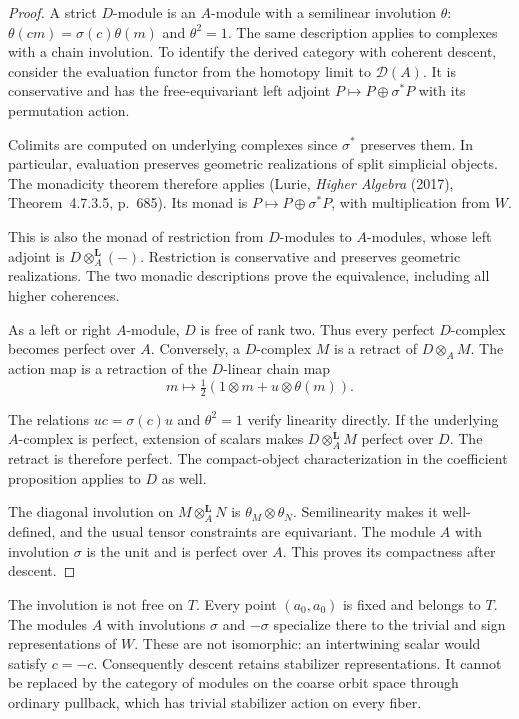 \begin{proof}
A strict $D$-module is an $A$-module with a semilinear involution $\theta$:
$\theta(cm)=\sigma(c)\theta(m)$ and $\theta^2=1$.
The same description applies to complexes with a chain involution.
To identify the derived category with coherent descent, consider the
evaluation functor from the homotopy limit to $\mathcal D(A)$.
It is conservative and has the free-equivariant left adjoint
$P\mapsto P\oplus\sigma^*P$ with its permutation action.

Colimits are computed on underlying complexes since $\sigma^*$ preserves them.
In particular, evaluation preserves geometric realizations of split simplicial objects.
The monadicity theorem therefore applies
(Lurie, \emph{Higher Algebra} (2017), Theorem~4.7.3.5, p.~685).
Its monad is $P\mapsto P\oplus\sigma^*P$, with multiplication from $W$.

This is also the monad of restriction from $D$-modules to $A$-modules,
whose left adjoint is $D\otimes_A^{\mathbf L}(-)$.
Restriction is conservative and preserves geometric realizations.
The two monadic descriptions prove the equivalence, including all higher coherences.

As a left or right $A$-module, $D$ is free of rank two.
Thus every perfect $D$-complex becomes perfect over $A$.
Conversely, a $D$-complex $M$ is a retract of $D\otimes_A M$.
The action map is a retraction of the $D$-linear chain map
\[
 m\longmapsto\tfrac12(1\otimes m+u\otimes\theta(m)).
\]

The relations $uc=\sigma(c)u$ and $\theta^2=1$ verify linearity directly.
If the underlying $A$-complex is perfect, extension of scalars makes
$D\otimes_A^{\mathbf L}M$ perfect over $D$.
The retract is therefore perfect.
The compact-object characterization in the coefficient proposition applies to $D$ as well.

The diagonal involution on $M\otimes_A^{\mathbf L}N$ is
$\theta_M\otimes\theta_N$.
Semilinearity makes it well-defined, and the usual tensor constraints are equivariant.
The module $A$ with involution $\sigma$ is the unit and is perfect over $A$.
This proves its compactness after descent.
\end{proof}

The involution is not free on $T$.
Every point $(a_0,a_0)$ is fixed and belongs to $T$.
The modules $A$ with involutions $\sigma$ and $-\sigma$ specialize there
to the trivial and sign representations of $W$.
These are not isomorphic: an intertwining scalar would satisfy $c=-c$.
Consequently descent retains stabilizer representations.
It cannot be replaced by the category of modules on the coarse orbit space
through ordinary pullback, which has trivial stabilizer action on every fiber.

